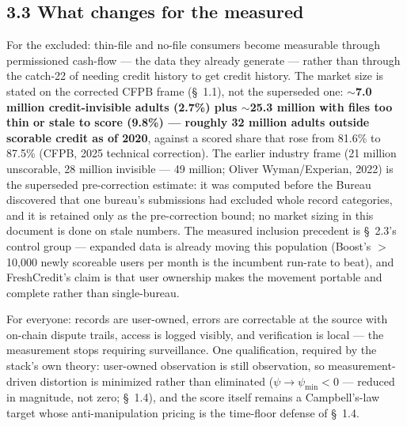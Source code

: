 \documentclass[11pt,twocolumn]{article}
\begin{document}
\subsection*{3.3 What changes for the measured}

For the excluded: thin-file and no-file consumers become measurable through permissioned cash-flow --- the data they already generate --- rather than through the catch-22 of needing credit history to get credit history. The market size is stated on the corrected CFPB frame (\S~1.1), not the superseded one: \textbf{$\sim$7.0 million credit-invisible adults (2.7\%) plus $\sim$25.3 million with files too thin or stale to score (9.8\%) --- roughly 32 million adults outside scorable credit as of 2020}, against a scored share that rose from 81.6\% to 87.5\% (CFPB, 2025 technical correction). The earlier industry frame (21 million unscorable, 28 million invisible --- 49 million; Oliver Wyman/Experian, 2022) is the superseded pre-correction estimate: it was computed before the Bureau discovered that one bureau's submissions had excluded whole record categories, and it is retained only as the pre-correction bound; no market sizing in this document is done on stale numbers. The measured inclusion precedent is \S~2.3's control group --- expanded data is already moving this population (Boost's $>$10,000 newly scoreable users per month is the incumbent run-rate to beat), and FreshCredit's claim is that user ownership makes the movement portable and complete rather than single-bureau.

For everyone: records are user-owned, errors are correctable at the source with on-chain dispute trails, access is logged visibly, and verification is local --- the measurement stops requiring surveillance. One qualification, required by the stack's own theory: user-owned observation is still observation, so measurement-driven distortion is minimized rather than eliminated ($\psi \rightarrow \psi_{\min} < 0$ --- reduced in magnitude, not zero; \S~1.4), and the score itself remains a Campbell's-law target whose anti-manipulation pricing is the time-floor defense of \S~1.4.
\end{document}

